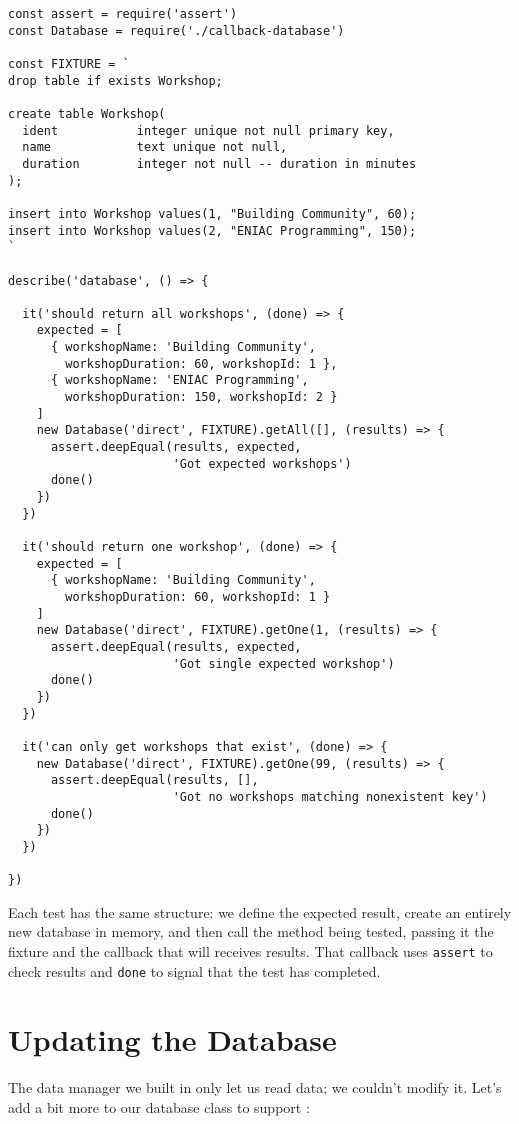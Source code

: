 \begin{verbatim}
const assert = require('assert')
const Database = require('./callback-database')

const FIXTURE = `
drop table if exists Workshop;

create table Workshop(
  ident           integer unique not null primary key,
  name            text unique not null,
  duration        integer not null -- duration in minutes
);

insert into Workshop values(1, "Building Community", 60);
insert into Workshop values(2, "ENIAC Programming", 150);
`

describe('database', () => {

  it('should return all workshops', (done) => {
    expected = [
      { workshopName: 'Building Community',
        workshopDuration: 60, workshopId: 1 },
      { workshopName: 'ENIAC Programming',
        workshopDuration: 150, workshopId: 2 }
    ]
    new Database('direct', FIXTURE).getAll([], (results) => {
      assert.deepEqual(results, expected,
                       'Got expected workshops')
      done()
    })
  })

  it('should return one workshop', (done) => {
    expected = [
      { workshopName: 'Building Community',
        workshopDuration: 60, workshopId: 1 }
    ]
    new Database('direct', FIXTURE).getOne(1, (results) => {
      assert.deepEqual(results, expected,
                       'Got single expected workshop')
      done()
    })
  })

  it('can only get workshops that exist', (done) => {
    new Database('direct', FIXTURE).getOne(99, (results) => {
      assert.deepEqual(results, [],
                       'Got no workshops matching nonexistent key')
      done()
    })
  })

})
\end{verbatim}

Each test has the same structure:
we define the expected result,
create an entirely new database in memory,
and then call the method being tested,
passing it the fixture and the callback that will receives results.
That callback uses \texttt{assert} to check results
and \texttt{done} to signal that the test has completed.

\section{Updating the Database}\label{s:db-mutate}

The data manager we built in  only let us read data;
we couldn't modify it.
Let's add a bit more to our database class to support :

